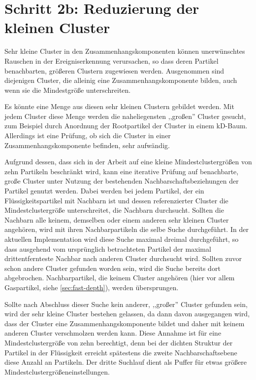

\section{Schritt 2b: Reduzierung der kleinen Cluster}\label{sec:clusterreduktion}

Sehr kleine Cluster in den Zusammenhangskomponenten können unerwünschtes Rauschen in der Ereigniserkennung verursachen, so dass deren Partikel benachbarten, größeren Clustern zugewiesen werden. Ausgenommen sind diejenigen Cluster, die alleinig eine Zusammenhangskomponente bilden, auch wenn sie die Mindestgröße unterschreiten.

Es könnte eine Menge aus diesen sehr kleinen Clustern gebildet werden. Mit jedem Cluster diese Menge werden die naheliegensten ,,großen'' Cluster gesucht, zum Beispiel durch Anordnung der Rootpartikel der Cluster in einem kD-Baum. Allerdings ist eine Prüfung, ob sich die Cluster in einer Zusammenhangskomponente befinden, sehr aufwändig.

Aufgrund dessen, dass sich in der Arbeit auf eine kleine Mindestclustergrößen von zehn Partikeln beschränkt wird, kann eine iterative Prüfung auf benachbarte, große Cluster unter Nutzung der bestehenden Nachbarschaftsbeziehungen der Partikel genutzt werden. Dabei werden bei jedem Partikel, der ein Flüssigkeitspartikel mit Nachbarn ist und dessen referenzierter Cluster die Mindestclustergröße unterschreitet, die Nachbarn durchsucht. Sollten die Nachbarn alle keinem, demselben oder einem anderen sehr kleinen Cluster angehören, wird mit ihren Nachbarpartikeln die selbe Suche durchgeführt. In der aktuellen Implementation wird diese Suche maximal dreimal durchgeführt, so dass ausgehend vom ursprünglich betrachteten Partikel der maximal drittentfernteste Nachbar nach anderen Cluster durchsucht wird. Sollten zuvor schon andere Cluster gefunden worden sein, wird die Suche bereits dort abgebrochen. Nachbarpartikel, die keinem Cluster angehören (hier vor allem Gaspartikel, siehe \autoref{sec:fast-depth}), werden übersprungen.

Sollte nach Abschluss dieser Suche kein anderer, ,,großer'' Cluster gefunden sein, wird der sehr kleine Cluster bestehen gelassen, da dann davon ausgegangen wird, dass der Cluster eine Zusammenhangskomponente bildet und daher mit keinem anderen Cluster verschmolzen werden kann. Diese Annahme ist für eine Mindestclustergröße von zehn berechtigt, denn bei der dichten Struktur der Partikel in der Flüssigkeit erreicht spätestens die zweite Nachbarschaftsebene diese Anzahl an Partikeln. Der dritte Suchlauf dient als Puffer für etwas größere Mindestclustergrößeneinstellungen.

